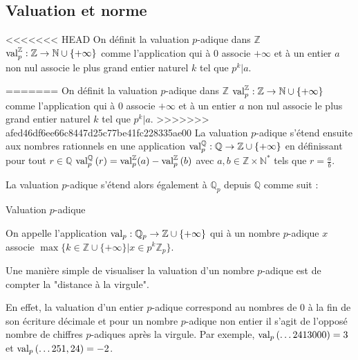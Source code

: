 \subsection{Valuation et norme}

<<<<<<< HEAD
On définit la valuation $p$-adique dans $\mathbb{Z}$ $\text{val}_p^{\mathbb{Z}}:\mathbb{Z}\to \mathbb{N}\cup \{+\infty\}  $ comme l'application qui à 0 associe $+\infty$ et à un entier $a$ non nul associe le plus grand entier naturel $k$ tel que $p^k | a$.%

=======
On définit la valuation $p$-adique dans $\mathbb{Z}$ $\text{val}_p^{\mathbb{Z}}:\mathbb{Z}\to \mathbb{N}\cup \{+\infty\}  $ comme l'application qui à 0 associe $+\infty$ et à un entier $a$ non nul associe le plus grand entier naturel $k$ tel que $p^k | a$.
>>>>>>> afed46df6ee66c8447d25c77be41fc228335ae00
La valuation $p$-adique s'étend ensuite aux nombres rationnels en une application $\text{val}_p^{\mathbb{Q}} : \mathbb{Q} \to \mathbb{Z}\cup \{+\infty\}   $ en définissant pour tout $r \in \mathbb{Q}$  $\text{val}_p^{\mathbb{Q}} \left( r \right) = \text{val}_p^\mathbb{Z}(a)- \text{val}_p^\mathbb{Z}\left( b \right) $ avec $a,b \in \mathbb{Z} \times \mathbb{N}^*$ tels que $r=\frac{a}{b}.$   

La valuation $p$-adique s'étend alors également à $\mathbb{Q}_p$ depuis $\mathbb{Q}$ comme suit :
\begin{definition} Valuation $p$-adique
  
	On appelle  l'application $\text{val}_p: \mathbb{Q}_p \to \mathbb{Z}\cup \{+\infty\}  $ qui à un nombre $p$-adique $x$ associe $\max \{k \in \mathbb{Z}\cup \{+\infty\}| x\in p^k \mathbb{Z}_p\}$. 
\end{definition}
Une manière simple de visualiser la valuation d'un nombre $p$-adique est de compter la "distance à la virgule".

En effet, la valuation d'un entier $p$-adique correspond au nombres de $0$ à la fin de son écriture décimale et pour un nombre $p$-adique non entier il s'agit de l'opposé nombre de chiffres $p$-adiques après la virgule. Par exemple, $\text{val}_p\left( \ldots 2413000 \right) = 3$ et $\text{val}_p\left( \ldots 251,24 \right) = -2$.

